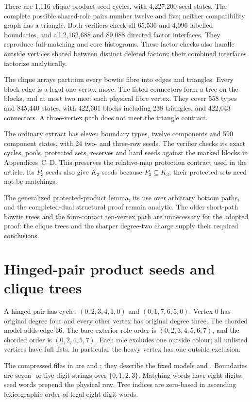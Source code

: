 \documentclass[11pt]{article}
\numberwithin{equation}{section}
\numberwithin{table}{section}
\begin{document}
There are 1,116 clique-product seed cycles, with 4,227,200 seed
states. The complete possible shared-role pairs number twelve and
five; neither compatibility graph has a triangle. Both verifiers
check all 65,536 and 4,096 labelled boundaries, and all 2,162,688
and 89,088 directed factor interfaces. They reproduce full-matching
and core histograms. These factor checks also handle
outside vertices shared between distinct deleted factors; their
combined interfaces factorize analytically.

The clique arrays partition every bowtie fibre into edges and
triangles. Every block edge is a legal one-vertex move. The listed
connectors form a tree on the blocks, and at most two meet each
physical fibre vertex. They cover 558 types and 845,440 states,
with 422,601 blocks including 238 triangles, and 422,043 connectors.
A three-vertex path does not meet the triangle contract.

The ordinary extract has eleven boundary types, twelve components
and 590 component states, with 24 two- and three-row seeds.
The verifier checks its exact cycles, pools, protected sets, reserves
and hard seeds against the marked blocks in Appendices~C--D.
This preserves the relative-map protection contract used in the
article. Its $P_3$ seeds also give $K_3$ seeds because
$P_3\subseteq K_3$; their protected sets need not be matchings.

The generalized protected-product lemma, its use over arbitrary
bottom paths, and the completed-dual structural proof remain analytic.
The older short-path bowtie trees and the four-contact ten-vertex
path are unnecessary for the adopted proof: the clique trees and the sharper degree-two
charge supply their required conclusions.

\clearpage
\section{Hinged-pair product seeds and clique trees}
\label{app:hinged-pair-certificates}
A hinged pair has cycles $(0,2,3,4,1,0)$ and $(0,1,7,6,5,0)$.
Vertex $0$ has original degree four and every other vertex has original
degree three. The chorded model adds edge $36$. The bare exterior-role
order is $(0,2,3,4,5,6,7)$, and the chorded order is $(0,2,4,5,7)$.
Each role excludes one outside colour; all unlisted vertices have full
lists. In particular the heavy vertex has one outside exclusion.

The compressed files in  are
 and ; they describe the fixed
models  and . Boundaries are
seven- or five-digit strings over $\{0,1,2,3\}$. Matching words have
eight digits; seed words prepend the physical row. Tree indices are
zero-based in ascending lexicographic order of legal eight-digit words.
\end{document}
